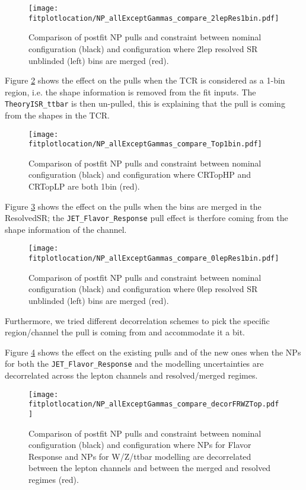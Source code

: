 \begin{figure}[ht]
  \centering
	\texttt{[image: \\fitplotlocation/NP\_allExceptGammas\_compare\_2lepRes1bin.pdf]}
	\caption{Comparison of postfit NP pulls and constraint between nominal configuration (black) and configuration where 2lep resolved SR unblinded (left) bins are merged (red).}
  \label{fig:NPOld_compare_2lep1bin}
\end{figure}

\clearpage
Figure \ref{fig:NPOld_compare_Top1bin} shows the effect on the pulls when the TCR is considered as a 1-bin region, 
i.e. the shape information is removed from the fit inputs. The \texttt{TheoryISR\_ttbar} is then un-pulled, 
this is explaining that the pull is coming from the shapes in the TCR.

\begin{figure}[ht]
  \centering
  \texttt{[image: \\fitplotlocation/NP\_allExceptGammas\_compare\_Top1bin.pdf]}
	\caption{Comparison of postfit NP pulls and constraint between nominal configuration (black) and configuration where CRTopHP and CRTopLP are both 1bin (red).}
  \label{fig:NPOld_compare_Top1bin}
\end{figure}


\clearpage
Figure \ref{fig:NPOld_compare_0lep1bin} shows the effect on the pulls when the bins are merged in the \zlep ResolvedSR;
the \texttt{JET\_Flavor\_Response} pull effect is therfore coming from the shape information of the \zlep channel.

\begin{figure}[ht]
  \centering
	\texttt{[image: \\fitplotlocation/NP\_allExceptGammas\_compare\_0lepRes1bin.pdf]}
	\caption{Comparison of postfit NP pulls and constraint between nominal configuration (black) and configuration where 0lep resolved SR unblinded (left) bins are merged (red).}
  \label{fig:NPOld_compare_0lep1bin}
\end{figure}

\clearpage
Furthermore, we tried different decorrelation schemes to pick the specific region/channel the pull is coming from
and accommodate it a bit.

Figure \ref{fig:NPOldDecorFRWZTop} shows the effect on the existing pulls and of the new ones 
when the NPs for both the \texttt{JET\_Flavor\_Response} and the modelling uncertainties are decorrelated
across the lepton channels and resolved/merged regimes.

\begin{figure}[h]
  \centering
  \texttt{[image: \\fitplotlocation/NP\_allExceptGammas\_compare\_decorFRWZTop.pdf]}
	\caption{Comparison of postfit NP pulls and constraint between nominal configuration (black) and configuration where NPs for Flavor Response and NPs for W/Z/ttbar modelling are decorrelated between the lepton channels and between the merged and resolved regimes (red).}
  \label{fig:NPOldDecorFRWZTop}
\end{figure}


